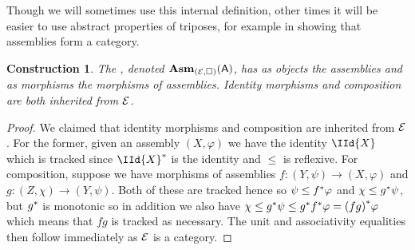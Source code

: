 \documentclass[11pt]{article}
\newtheorem{cons}[thrm]{Construction}
\begin{document}
Though we will sometimes use this internal definition, other times it will be
easier to use abstract properties of triposes, for example in showing that
assemblies form a category.

\begin{cons}
  The , denoted \(\mathbf{Asm}_{(\mathcal{E},\Box)}(\mathsf{A})\), has as objects
  the assemblies and as morphisms the morphisms of assemblies.
  Identity morphisms and composition are both inherited from \(\mathcal{E}\).
\end{cons}
\begin{proof}
  We claimed that identity morphisms and composition are inherited from \(\mathcal{E}\).
  For the former, given an assembly \((X,\varphi)\) we have the identity
  \(\IId{X}\) which is tracked since \(\TPull{\IId{X}}\) is the identity and
  \(\leq\) is reflexive.
  For composition, suppose we have morphisms of assemblies
  \(f : (Y,\psi) \to (X,\varphi)\) and \(g : (Z,\chi)\to(Y,\psi)\).
  Both of these are tracked hence so \(\psi \leq {f}^\ast\varphi\) and
  \(\chi \leq {g}^\ast\psi\), but \({g}^\ast\) is monotonic so in addition we
  also have
  \(\chi \leq {g}^\ast\psi \leq {g}^\ast{f}^\ast\varphi={(fg)}^\ast\varphi\)
  which means that \(fg\) is tracked as necessary.
  The unit and associativity equalities then follow immediately as \(\mathcal{E}\) is a
  category.
\end{proof}
\end{document}
